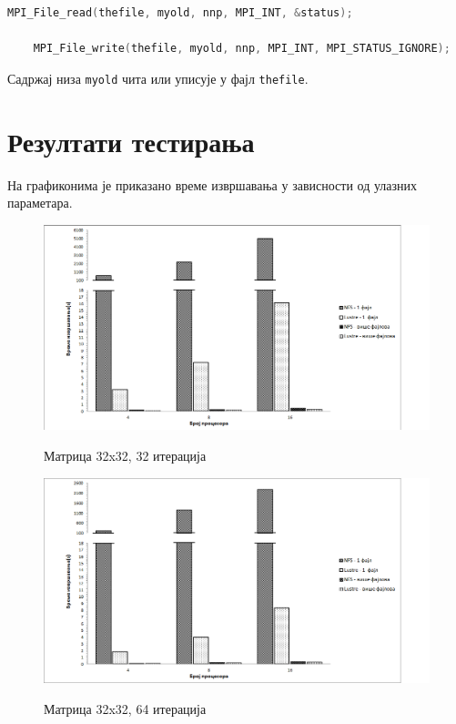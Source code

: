 \begin{lstlisting}[style=nonumbers,frame=single,language=C, caption=Функције за читање и писање у фајл]
	MPI_File_read(thefile, myold, nnp, MPI_INT, &status);
	
	MPI_File_write(thefile, myold, nnp, MPI_INT, MPI_STATUS_IGNORE);
\end{lstlisting}
Садржај низа \texttt{myold} чита или уписује у фајл \texttt{thefile}.

\newpage
\section{Резултати тестирања}

На графиконима је приказано време извршавања у зависности од улазних параметара. 
 
 \begin{figure}[H]
   \centering
       \includegraphics[width=1\textwidth]{slike/results/32_32.png}\\[1cm]
   \caption{Матрица 32x32, 32 итерација}
 \end{figure}
 
  \begin{figure}[H]
    \centering
        \includegraphics[width=1\textwidth]{slike/results/32_64.png}\\[1cm]
    \caption{Матрица 32x32, 64 итерација}
  \end{figure}
 
